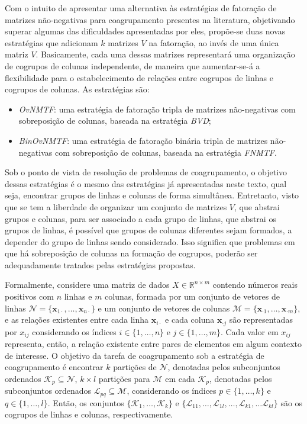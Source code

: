 \documentclass[
    12pt,                %
    oneside,            %
    a4paper,            %
    english,            %
    brazil                %
    ]{abntex2ppgsi}
\begin{document}
Com o intuito de apresentar uma alternativa às estratégias de fatoração de matrizes não-negativas para coagrupamento presentes na literatura, objetivando superar algumas das dificuldades apresentadas por eles, propõe-se duas novas estratégias que adicionam $k$ matrizes $V$ na fatoração, ao invés de uma única matriz $V$.
Basicamente, cada uma dessas matrizes representará uma organização de cogrupos de colunas independente, de maneira que aumentar-se-á a flexibilidade para o estabelecimento de relações entre cogrupos de linhas e cogrupos de colunas.
As estratégias são:

\begin{itemize}
\item \textit{OvNMTF}: uma estratégia de fatoração tripla de matrizes não-negativas com sobreposição de colunas, baseada na estratégia \textit{BVD};
\item \textit{BinOvNMTF}: uma estratégia de fatoração binária tripla de matrizes não-negativas com sobreposição de colunas, baseada na estratégia \textit{FNMTF}.
\end{itemize}

Sob o ponto de vista de resolução de problemas de coagrupamento, o objetivo dessas estratégias é o mesmo das estratégias já apresentadas neste texto, qual seja, encontrar grupos de linhas e colunas de forma simultânea.
Entretanto, visto que se tem a liberdade de organizar um conjunto de matrizes $V$, que abstrai grupos e colunas, para ser associado a cada grupo de linhas, que abstrai os grupos de linhas, é possível que grupos de colunas diferentes sejam formados, a depender do grupo de linhas sendo considerado.
Isso significa que problemas em que há sobreposição de colunas na formação de cogrupos, poderão ser adequadamente tratados pelas estratégias propostas.

Formalmente, considere uma matriz de dados $X \in \mathbb{R}^{n \times m}$ contendo números reais positivos com $n$ linhas e $m$ colunas, formada por um conjunto de vetores de linhas $\mathcal{N} = \{ \mathbf{x}_{1 \cdot}, \dots, \mathbf{x}_{n \cdot} \}$ e um conjunto de vetores de colunas $\mathcal{M} = \{\mathbf{x}_{\cdot 1}, \dots, \mathbf{x}_{\cdot m} \}$, e as relações existentes entre cada linha $\mathbf{x}_{i \cdot}$ e cada coluna $\mathbf{x}_{\cdot j}$ são representadas por $x_{ij}$ considerando os índices $i \in \{1, \dots, n\}$ e $j \in \{1, \dots, m\}$.
Cada valor em $x_{ij}$ representa, então, a relação existente entre pares de elementos em algum contexto de interesse.
O objetivo da tarefa de coagrupamento sob a estratégia de coagrupamento é encontrar $k$ partições de $\mathcal{N}$, denotadas pelos subconjuntos ordenados $\mathcal{K}_p \subseteq \mathcal{N}$, $k \times l$ partições para $\mathcal{M}$ em cada $\mathcal{K}_p$, denotadas pelos subconjuntos ordenados $\mathcal{L}_{pq} \subseteq \mathcal{M}$, considerando os índices $p \in \{ 1, \dots, k\}$ e $q \in \{1, \dots, l\}$.
Então, os conjuntos $\{\mathcal{K}_1, \dots, \mathcal{K}_k\}$ e $\{\mathcal{L}_{11}, \dots, \mathcal{L}_{1l}, \dots, \mathcal{L}_{k1}, \dots \mathcal{L}_{kl}\}$ são os cogrupos de linhas e colunas, respectivamente.
\end{document}
